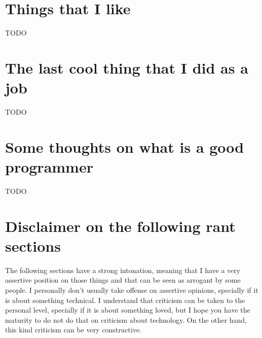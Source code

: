 \documentclass[11pt,a4paper,sans]{moderncv}
\begin{document}
\section{Things that I like}
TODO

\section{The last cool thing that I did as a job}
TODO

\section{Some thoughts on what is a good programmer}
TODO

\section{Disclaimer on the following rant sections}
The following sections have a strong intonation, meaning that I have a very assertive position on those things and that can be seen as arrogant by some people.
I personally don't usually take offense on assertive opinions, specially if it is about something technical.
I understand that criticism can be taken to the personal level, specially if it is about something loved, but I hope you have the maturity to do not do that on criticism about technology.
On the other hand, this kind criticism can be very constructive.
\end{document}
